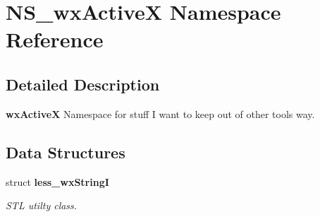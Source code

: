 \section{NS\_\-wx\-Active\-X Namespace Reference}
\label{namespaceNS__wxActiveX}


\subsection{Detailed Description}
{\bf wx\-Active\-X} Namespace for stuff I want to keep out of other tools way.



\subsection*{Data Structures}
\begin{CompactItemize}
\item 
struct {\bf less\_\-wx\-String\-I}
\begin{CompactList}\small\item\em STL utilty class.\item\end{CompactList}\end{CompactItemize}
